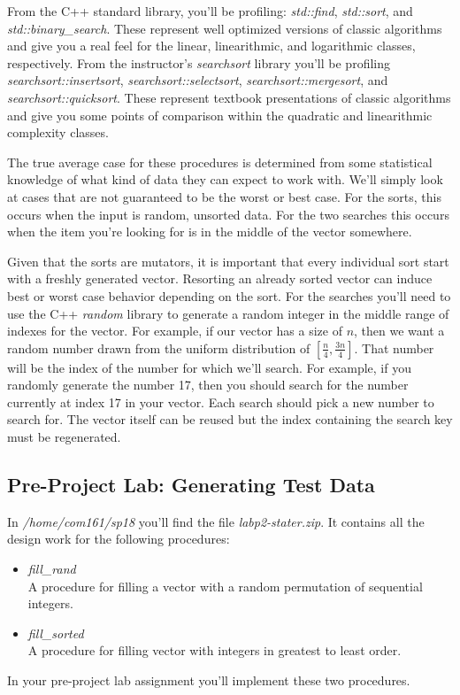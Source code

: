 \documentclass[nobib]{tufte-handout}
\begin{document}
From the C++ standard library, you'll be profiling: \textit{std::find}, \textit{std::sort}, and \textit{std::binary\_search}. These represent well optimized versions of classic algorithms and give you a real feel for the linear, linearithmic, and logarithmic classes, respectively. From the instructor's \textit{searchsort} library you'll be profiling \textit{searchsort::insertsort}, \textit{searchsort::selectsort},  \textit{searchsort::mergesort}, and \textit{searchsort::quicksort}. These represent textbook presentations of classic algorithms and give you some points of comparison within the quadratic and linearithmic complexity classes.

The true average case for these procedures is determined from some statistical knowledge of what kind of data they can expect to work with. We'll simply look at cases that are not guaranteed to be the worst or best case. For the sorts, this occurs when the input is random, unsorted data.  For the two searches this occurs when the item you're looking for is in the middle of the vector somewhere.

Given that the sorts are mutators, it is important that every individual sort start with a freshly generated vector. Resorting an already sorted vector can induce best or worst case behavior depending on the sort.  For the searches you'll need to use the C++ \textit{random} library to generate a random integer in the middle range of indexes for the vector. For example, if our vector has a size of \(n\), then we want a random number drawn from the uniform distribution of \( [\frac{n}{4},\frac{3n}{4}] \). That number will be the index of the number for which we'll search. For example, if you randomly generate the number 17, then you should search for the number currently at index 17 in your vector. Each search should pick a new number to search for.  The vector itself can be reused but the index containing the search key must be regenerated.

\subsection{Pre-Project Lab: Generating Test Data}

In \textit{/home/com161/sp18} you'll find the file \textit{labp2-stater.zip}. It contains all the design work for the following procedures:
\begin{itemize}
  \item \textit{fill\_rand} \\
  A procedure for filling a vector with a random permutation of sequential integers.
  \item \textit{fill\_sorted} \\
  A procedure for filling vector with integers in greatest to least order.
\end{itemize}
In your pre-project lab assignment you'll implement these two procedures.
\end{document}
